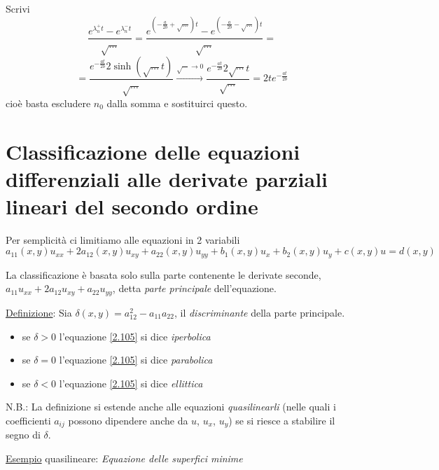 \documentclass[a4paper,11pt]{report}
\begin{document}
Scrivi
\[
\frac{e^{\lambda_n^+ t} - e^{\lambda_n^- t}}{\sqrt{\dots}}= \frac{e^{\left(-\frac{a}{2b}+\sqrt{\dots}\right)t}- e^{\left(-\frac{a}{2b}-\sqrt{\dots}\right)t}}{\sqrt{\dots}}=
\]
\[
=\frac{e^{-\frac{at}{2b}} 2\sinh (\sqrt{\dots} t)}{\sqrt{\dots}} \xrightarrow{\sqrt{\cdots}\to 0} \frac{e^{-\frac{at}{2b}}2\sqrt{\cdots}t}{\sqrt{\cdots}}=2te^{-\frac{at}{2b}}
\]
cio\`e basta escludere $n_0$ dalla somma e sostituirci questo.

\section{Classificazione delle equazioni differenziali alle derivate parziali lineari del secondo ordine}

Per semplicit\`a ci limitiamo alle equazioni in 2 variabili
\begin{equation}
a_{11}(x,y)u_{xx} + 2a_{12}(x,y)u_{xy} + a_{22}(x,y)u_{yy} + b_{1}(x,y)u_{x} + b_2(x,y)u_y + c(x,y)u = d(x,y)
\label{2.105}
\end{equation}

La classificazione \`e basata solo sulla parte contenente le derivate seconde, $a_{11}u_{xx} + 2a_{12}u_{xy} +a_{22}u_{yy}$, detta \emph{parte principale} dell'equazione.

\smallskip

\underline{Definizione}: Sia $\delta(x,y)=a_{12}^2 - a_{11}a_{22}$, il \emph{discriminante} della parte principale.
\begin{itemize}
\item se $\delta >0$ l'equazione \eqref{2.105} si dice \emph{iperbolica}
\item se $\delta =0$ l'equazione \eqref{2.105} si dice \emph{parabolica}
\item se $\delta <0$ l'equazione \eqref{2.105} si dice \emph{ellittica}
\end{itemize}
N.B.: La definizione si estende anche alle equazioni \emph{quasilinearli} (nelle quali i coefficienti $a_{ij}$ possono dipendere anche da $u$, $u_x$, $u_y$) se si riesce a stabilire il segno di $\delta$.

\medskip

\underline{Esempio} quasilineare: \emph{Equazione delle superfici minime}
\end{document}
